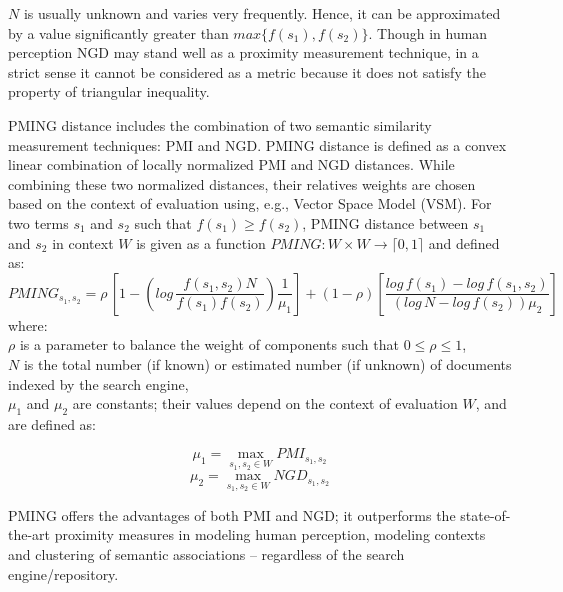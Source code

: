 $N$ is usually unknown and varies very frequently. Hence, it can be approximated by a value significantly greater than $max \{ f(s_1), f(s_2)\}$.
Though in human perception NGD may stand well as a proximity measurement technique, in a strict sense it cannot be considered as a metric because it does not satisfy the property of triangular inequality.

PMING distance \cite{franzoni2012pming,franzoni2017just} includes the combination of two semantic similarity measurement techniques: PMI and NGD. PMING distance is defined as a convex linear combination of locally normalized PMI and NGD distances. While combining these two normalized distances, their relatives weights are chosen  based on the context of evaluation using, e.g., Vector Space Model (VSM). For two terms $s_1$ and $s_2$ such that $f(s_1) \geq f(s_2)$, PMING distance between $s_1$ and $s_2$ in context $W$ is given as a function $PMING: W \times W \to \lceil0,1\rceil$ and defined as:
\begin{equation}
PMING_{s_1, s_2}= \rho \,\left[1- \left(log\,\frac{f(s_1, s_2)N}{f(s_1)f(s_2)}\right)\frac{1}{\mu_1}\right] + (1-\rho)\left[\frac{log\, f(s_1)- log\, f(s_1, s_2)}{(log \, N- log \, f(s_2))\mu_2}\right]
\end{equation}
where:\\
$\rho$ is a parameter to balance the weight of components such that $0\leq \rho \leq 1$,\\
$N$ is the total number (if known) or estimated number (if unknown) of documents indexed by the search engine,\\
$\mu_1$ and $\mu_2$ are constants; their values depend on the context of evaluation $W$, and are defined as:



\begin{equation}
\mu_1=\max_{{s_1, s_2}\in W} PMI_{s_1, s_2} \end{equation}
\begin{equation} 
\mu_2=\max_{{s_1, s_2}\in W} NGD_{s_1, s_2} 
\end{equation}



PMING offers the advantages of both PMI and NGD; it outperforms the state-of-the-art proximity measures in modeling human perception, modeling contexts and clustering of semantic associations -- regardless of the search engine/repository.


